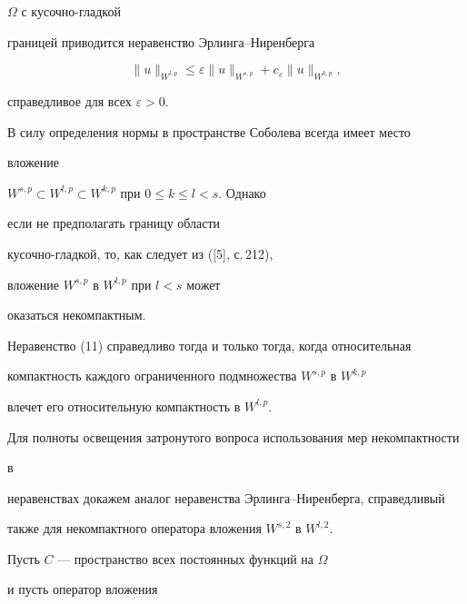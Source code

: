 $\Omega$ с кусочно-гладкой  


границей приводится неравенство Эрлинга--Ниренберга 


\begin{equation} 


\|u\|_{W^{l,p}}\le\varepsilon\|u\|_{W^{s,p}}+ 


c_\varepsilon\|u\|_{W^{k,p}}, 


\end{equation} 


справедливое для всех $\varepsilon>0$. 


 


В силу определения нормы в пространстве Соболева всегда имеет место 


вложение  


$W^{s,p}\subset W^{l,p}\subset W^{k,p}$ при $0\le   k\le l<s$. Однако 


если не предполагать границу области  


кусочно-гладкой, то, как следует из ([5], с.\,212), 


вложение $W^{s,p}$ в $W^{l,p}$ при $l<s$ может  


оказаться некомпактным. 


 


\begin{cor} 


Неравенство (11) справедливо тогда и только тогда, когда относительная  


компактность каждого ограниченного подмножества $W^{s,p}$ в $W^{k,p}$ 


влечет его относительную компактность в $W^{l,p}$. 


\end{cor} 


 


Для полноты освещения затронутого вопроса использования мер некомпактности  


в  


неравенствах докажем аналог неравенства Эрлинга--Ниренберга, справедливый 


также для некомпактного оператора вложения $W^{s,2}$ в $W^{l,2}$. 


 


Пусть $C$ --- пространство всех постоянных функций на $\Omega$ 


и пусть оператор вложения 


